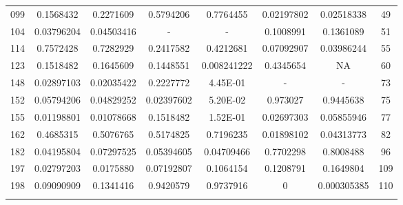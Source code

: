 \begin{table}[H]
{\begin{tabular}{cccccccc}
099 & 0.1568432 & 0.2271609 & 0.5794206 & 0.7764455 & {\color{red}0.02197802} & {\color{red}0.02518338} & 49 \\ 
104 & {\color{red}0.03796204} & {\color{red}0.04503416} & - & - &  0.1008991 & 0.1361089 & 51 \\ 
114 & 0.7572428 & 0.7282929 & 0.2417582 & 0.4212681 & 0.07092907 & {\color{red}0.03986244} & 55 \\ 
123 & 0.1518482 & 0.1645609 & 0.1448551 & {\color{red}0.008241222} & 0.4345654 & NA & 60 \\ 
148 & {\color{red}0.02897103} & {\color{red}0.02035422} & 0.2227772 & 4.45E-01 & - & - &  73 \\ 
152 & 0.05794206 & {\color{red}0.04829252} & {\color{red}0.02397602} & 5.20E-02 & 0.973027 & 0.9445638 & 75 \\ 
155 & {\color{red}0.01198801} & {\color{red}0.01078668} & 0.1518482 & 1.52E-01 & {\color{red}0.02697303} & 0.05855946 & 77 \\ 
162 & 0.4685315 & 0.5076765 & 0.5174825 & 0.7196235 & {\color{red}0.01898102} & {\color{red}0.04313773} & 82 \\ 
182 & {\color{red}0.04195804} & 0.07297525 & 0.05394605 & {\color{red}0.04709466} & 0.7702298 & 0.8008488 & 96 \\ 
197 & {\color{red}0.02797203} & {\color{red}0.0175880} & 0.07192807 & 0.1064154 & 0.1208791 & 0.1649804 & 109 \\
198 & 0.09090909 & 0.1341416 & 0.9420579 & 0.9737916 & {\color{red}0} & {\color{red}0.000305385} & 110 \\ \hline		
\label{tab:sorinorotation1}
\end{tabular}
}
\end{table}



